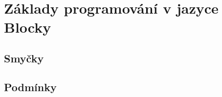 \documentclass[../main.tex]{subfiles}
\begin{document}
	\section{Základy programování v jazyce Blocky}

	\subsection{Smyčky}

	\subsection{Podmínky}
\end{document}

